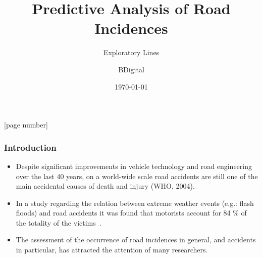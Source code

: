 \documentclass[hyperref={pdfpagelabels=true}]{beamer}
\title{Predictive Analysis of Road Incidences}
\subtitle{Exploratory Lines}
\author{BDigital}
\date{\today}
\begin{document}
\captionsetup{font=scriptsize,labelfont=scriptsize}

[page number]
\begin{frame}
\titlepage
\end{frame} 
 
\begin{frame}
\frametitle{Introduction}
\begin{overprint}
\begin{itemize}
\item Despite significant improvements in vehicle technology and road engineering over the last 40 years, on a world-wide scale 
road accidents are still one of the main accidental causes of death and injury (WHO, 2004).\\
\item In a study regarding the relation between extreme weather events (e.g.: flash floods) and road accidents it was found that motorists account for 84 \% of the totality of the
victims~\cite{calabria}.
\item The assessment of the occurrence of road incidences in general, and accidents in particular, has attracted the attention of many researchers.
\end{itemize}
\end{overprint}
\end{frame}
\end{document}
